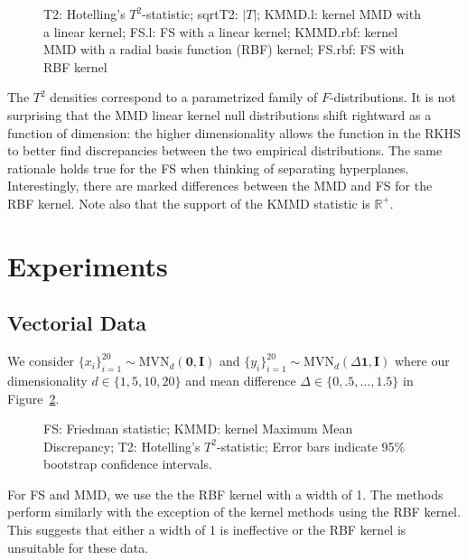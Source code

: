 \begin{figure}
  \begin{center}
    \resizebox{14.0cm}{!}{
      
    }
  \end{center}
\caption{T2: Hotelling's $T^2$-statistic; sqrtT2: $|T|$;
KMMD.l: kernel MMD with a linear kernel; FS.l: FS with a
linear kernel; KMMD.rbf: kernel MMD with a radial basis function (RBF) kernel;
FS.rbf: FS with RBF kernel}
\label{fig:null_dist}
\end{figure}

The $T^2$ densities correspond to a
parametrized family of $F$-distributions.  It is not surprising that the MMD
linear kernel null distributions shift rightward as a function of
dimension: the higher dimensionality allows the function in the RKHS
to better find discrepancies between the two empirical distributions.
The same rationale holds true for the FS when thinking of separating
hyperplanes.  Interestingly, there are marked differences between the
MMD and FS for the RBF kernel.  Note also that the support of the KMMD
statistic is $\mathbb{R}^+$.

\section{Experiments}
\subsection{Vectorial Data}
We consider $\{x_i\}_{i=1}^{20} \sim \mathrm{MVN}_d(\mathbf{0},
\mathbf{I})$ and $\{y_i\}_{i=1}^{20} \sim
\mathrm{MVN}_d(\Delta \mathbf{1}, \mathbf{I})$ where our
dimensionality $d \in \{1, 5, 10, 20\}$ and mean difference $\Delta \in
\{0, .5, \ldots, 1.5\}$ in Figure~\ref{fig:power_normal}.

\begin{figure}
  \begin{center}
    \resizebox{14.0cm}{!}{
      
    }
  \end{center}
  \caption{FS: Friedman statistic; KMMD: kernel Maximum Mean
    Discrepancy; T2: Hotelling's $T^2$-statistic; Error bars indicate
    95\% bootstrap confidence intervals.}
  \label{fig:power_normal}
\end{figure}

For FS and MMD, we use the the RBF kernel with a width of 1.  The
methods perform similarly with the exception of the kernel methods
using the RBF kernel.  This suggests that either a width of 1 is
ineffective or the RBF kernel is unsuitable for these data.

